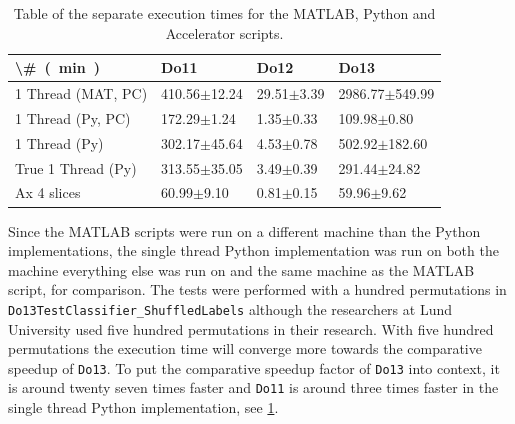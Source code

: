 \documentclass[12pt, a4paper]{article}
\begin{document}
\begin{table}[H]
\centering
    \caption{Table of the separate execution times for the MATLAB, Python and Accelerator scripts.}
    \begin{tabular}{|l|l|l|l|}
    \hline
    \SI[parse-numbers=false]{\#}{(\minute)}    & Do11             & Do12           & Do13               \\ \hline
    1 Thread (MAT, PC) & 410.56$\pm$12.24 & 29.51$\pm$3.39 & 2986.77$\pm$549.99 \\ \hline
    1 Thread (Py, PC)  & 172.29$\pm$1.24  & 1.35$\pm$0.33  & 109.98$\pm$0.80    \\ \hline
    1 Thread (Py)      & 302.17$\pm$45.64 & 4.53$\pm$0.78  & 502.92$\pm$182.60  \\ \hline
    True 1 Thread (Py) & 313.55$\pm$35.05 & 3.49$\pm$0.39  & 291.44$\pm$24.82   \\ \hline
    Ax 4 slices        & 60.99$\pm$9.10   & 0.81$\pm$0.15  & 59.96$\pm$9.62     \\ \hline
    \end{tabular}
    \label{AppendixSeperateTimes}
\end{table}


Since the MATLAB scripts were run on a different machine than the Python implementations, the single thread Python implementation was run on both the machine everything else was run on and the same machine as the MATLAB script, for comparison.
The tests were performed with a hundred permutations in \texttt{Do13TestClassifier\_ShuffledLabels} although the researchers at Lund University used five hundred permutations in their research.
With five hundred permutations the execution time will converge more towards the comparative speedup of \texttt{Do13}.
To put the comparative speedup factor of \texttt{Do13} into context, it is around twenty seven times faster and \texttt{Do11} is around three times faster in the single thread Python implementation, see \cref{AppendixSeperateTimes}.
\end{document}
